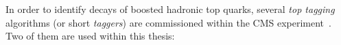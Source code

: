In order to identify decays of boosted hadronic top quarks, several \textit{top tagging} algorithms (or short \textit{taggers}) are commissioned within the CMS experiment~\cite{CMS-PAS-JME-13-007, CMS-DP-2014-036}. Two of them are used within this thesis:

